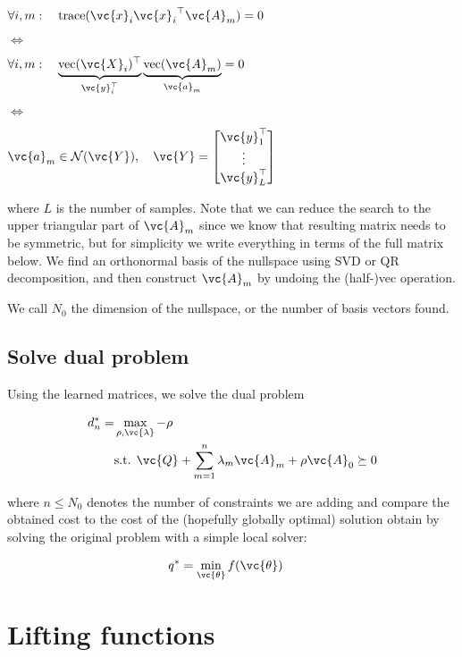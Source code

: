 \(\forall i, m: \quad \text{trace}(\vc{x}_{i}{\vc{x}_{i}}^\top\vc{A}_m) = 0\)

\(\iff\)

\(\forall i, m: \quad \underbrace{\text{vec}(\vc{X}_{i})^\top}_{\vc{y}_{i}^\top} \underbrace{\text{vec}(\vc{A}_m)}_{\vc{a}_m} = 0\)

\(\iff\)

\(\vc{a}_m \in \mathcal{N}(\vc{Y}), \quad \vc{Y} = \begin{bmatrix} \vc{y}_1^{\top} \\ \vdots \\ \vc{y}_L^{\top}\end{bmatrix}\)

where \(L\) is the number of samples. Note that we can reduce the search
to the upper triangular part of \(\vc{A}_m\) since we know that
resulting matrix needs to be symmetric, but for simplicity we write
everything in terms of the full matrix below. We find an orthonormal
basis of the nullspace using SVD or QR decomposition, and then construct
\(\vc{A}_m\) by undoing the (half-)vec operation.

We call \(N_0\) the dimension of the nullspace, or the number of basis
vectors found.

\subsection{Solve dual problem}

Using the learned matrices, we solve the dual problem

\begin{align} 
d_n^* = &\max_{\rho, \vc{\lambda}} -\rho \\
&\text{s.t. } \vc{Q} + \sum_{m=1}^n \lambda_m \vc{A}_m + \rho \vc{A}_0 \succeq 0
\end{align}

where \(n \leq N_0\) denotes the number of constraints we are adding and
compare the obtained cost to the cost of the (hopefully globally
optimal) solution obtain by solving the original problem with a simple
local solver:

\begin{align}
q^* &= \min_{\vc{\theta}} f(\vc{\theta})
\end{align}


\section{Lifting functions}


